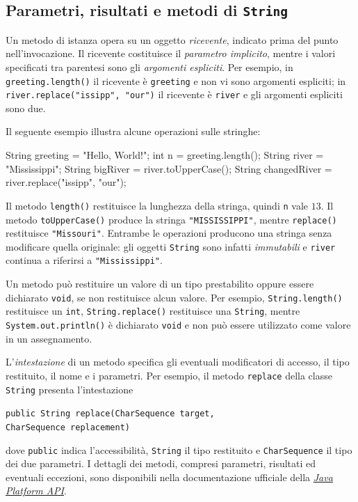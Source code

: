\subsection{Parametri, risultati e metodi di \texttt{String}}
\label{sec:fi-java-metodi-string}

Un metodo di istanza opera su un oggetto \emph{ricevente},
indicato prima del punto nell'invocazione. Il ricevente
costituisce il \emph{parametro implicito}, mentre i valori
specificati tra parentesi sono gli \emph{argomenti espliciti}.
Per esempio, in \texttt{greeting.length()} il ricevente è
\texttt{greeting} e non vi sono argomenti espliciti; in
\texttt{river.replace("issipp", "our")} il ricevente è
\texttt{river} e gli argomenti espliciti sono due.

\begin{example}
Il seguente esempio illustra alcune operazioni sulle stringhe:
\begin{unipdcode}[language=Java]
String greeting = "Hello, World!";
int n = greeting.length();
String river = "Mississippi";
String bigRiver = river.toUpperCase();
String changedRiver = river.replace("issipp", "our");
\end{unipdcode}

Il metodo \texttt{length()} restituisce la lunghezza della
stringa, quindi \texttt{n} vale \(13\).
Il metodo \texttt{toUpperCase()} produce la stringa
\texttt{"MISSISSIPPI"}, mentre \texttt{replace()} restituisce
\texttt{"Missouri"}. Entrambe le operazioni producono una
stringa senza modificare quella originale: gli oggetti
\texttt{String} sono infatti \emph{immutabili} e
\texttt{river} continua a riferirsi a \texttt{"Mississippi"}.
\end{example}

Un metodo può restituire un valore di un tipo prestabilito
oppure essere dichiarato \texttt{void}, se non restituisce
alcun valore. Per esempio, \texttt{String.length()}
restituisce un \texttt{int}, \texttt{String.replace()}
restituisce una \texttt{String}, mentre
\texttt{System.out.println()} è dichiarato \texttt{void}
e non può essere utilizzato come valore in un assegnamento.

L'\emph{intestazione} di un metodo specifica gli eventuali
modificatori di accesso, il tipo restituito, il nome e i
parametri. Per esempio, il metodo \texttt{replace} della
classe \texttt{String} presenta l'intestazione
\begin{center}
  \texttt{public String replace(CharSequence target,}\\
  \texttt{CharSequence replacement)}
\end{center}
dove \texttt{public} indica l'accessibilità, \texttt{String}
il tipo restituito e \texttt{CharSequence} il tipo dei
due parametri. I dettagli dei metodi, compresi parametri, risultati ed eventuali
eccezioni, sono disponibili nella documentazione ufficiale della
\href{https://docs.oracle.com/en/java/javase/21/docs/api/index.html}
{\emph{Java Platform API}}.

